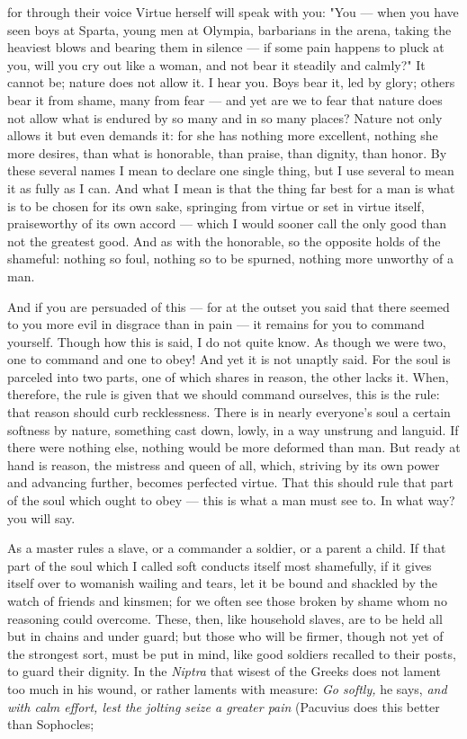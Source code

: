  for through their voice Virtue herself will speak with you: "You — when you have seen boys at Sparta, young men at Olympia, barbarians in the arena, taking the heaviest blows and bearing them in silence — if some pain happens to pluck at you, will you cry out like a woman, and not bear it steadily and calmly?" It cannot be; nature does not allow it. I hear you. Boys bear it, led by glory; others bear it from shame, many from fear — and yet are we to fear that nature does not allow what is endured by so many and in so many places? Nature not only allows it but even demands it: for she has nothing more excellent, nothing she more desires, than what is honorable, than praise, than dignity, than honor. By these several names I mean to declare one single thing, but I use several to mean it as fully as I can. And what I mean is that the thing far best for a man is what is to be chosen for its own sake, springing from virtue or set in virtue itself, praiseworthy of its own accord — which I would sooner call the only good than not the greatest good. And as with the honorable, so the opposite holds of the shameful: nothing so foul, nothing so to be spurned, nothing more unworthy of a man.

 And if you are persuaded of this — for at the outset you said that there seemed to you more evil in disgrace than in pain — it remains for you to command yourself. Though how this is said, I do not quite know. As though we were two, one to command and one to obey! And yet it is not unaptly said. For the soul is parceled into two parts, one of which shares in reason, the other lacks it. When, therefore, the rule is given that we should command ourselves, this is the rule: that reason should curb recklessness. There is in nearly everyone's soul a certain softness by nature, something cast down, lowly, in a way unstrung and languid. If there were nothing else, nothing would be more deformed than man. But ready at hand is reason, the mistress and queen of all, which, striving by its own power and advancing further, becomes perfected virtue. That this should rule that part of the soul which ought to obey — this is what a man must see to. In what way? you will say.

 As a master rules a slave, or a commander a soldier, or a parent a child. If that part of the soul which I called soft conducts itself most shamefully, if it gives itself over to womanish wailing and tears, let it be bound and shackled by the watch of friends and kinsmen; for we often see those broken by shame whom no reasoning could overcome. These, then, like household slaves, are to be held all but in chains and under guard; but those who will be firmer, though not yet of the strongest sort, must be put in mind, like good soldiers recalled to their posts, to guard their dignity. In the \textit{Niptra} that wisest of the Greeks does not lament too much in his wound, or rather laments with measure: \textit{Go softly,} he says, \textit{and with calm effort, lest the jolting seize a greater pain} (Pacuvius does this better than Sophocles;

